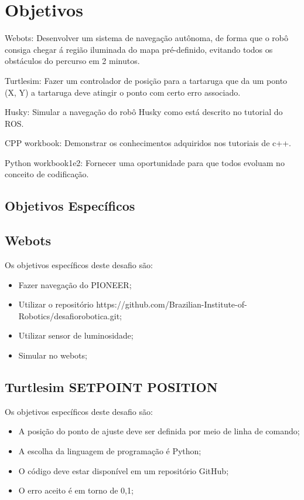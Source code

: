 \section{Objetivos}
\label{sec:obj}
      \item Webots:
Desenvolver um sistema de navegação autônoma, de forma que o robô consiga chegar 
á região iluminada do mapa pré-definido, evitando todos os obstáculos do percurso em 2 minutos.
      \item Turtlesim:
Fazer um controlador de posição para a tartaruga que da um ponto (X, Y) a tartaruga 
deve atingir o ponto com certo erro associado.
      \item Husky:
Simular a navegação do robô Husky como está descrito no tutorial do ROS.
      \item CPP workbook:
Demonstrar os conhecimentos adquiridos nos tutoriais de c++.
      \item Python workbook1e2:
Fornecer uma oportunidade para que todos evoluam no conceito de codificação.
\subsection{Objetivos Específicos}
\label{ssec:objesp}
\subsection{Webots}
Os objetivos específicos deste desafio são:
\begin{itemize}
      \item Fazer navegação do PIONEER;
      \item Utilizar o repositório https://github.com/Brazilian-Institute-of-Robotics/desafiorobotica.git;
      \item Utilizar sensor de luminosidade;
      \item Simular no webots;
  \end{itemize}
\subsection{Turtlesim SETPOINT POSITION}
Os objetivos específicos deste desafio são:
\begin{itemize}
      \item A posição do ponto de ajuste deve ser definida por meio de linha de comando;
      \item A escolha da linguagem de programação é Python;
      \item O código deve estar disponível em um repositório GitHub;
      \item O erro aceito é em torno de 0,1;
  \end{itemize}
